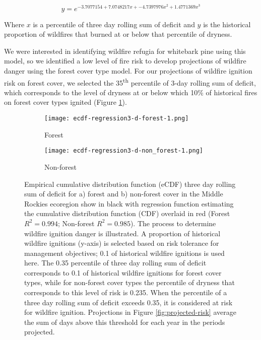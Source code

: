 \documentclass[11p]{article}
\begin{document}
\begin{equation*}
  y = e^{-3.7077154 + 7.0748217x + -4.7397976x^2 + 1.4771369x^3}
\end{equation*}

Where $x$ is a percentile of three day rolling sum of deficit and $y$ is the historical proportion of wildfires that burned at or below that percentile of dryness.

We were interested in identifying wildfire refugia for whitebark pine using this model, so we identified a low level of fire risk to develop projections of wildfire danger using the forest cover type model. For our projections of wildfire ignition risk on forest cover, we selected the 35\textsuperscript{th} percentile of 3-day rolling sum of deficit, which corresponds to the level of dryness at or below which 10\% of historical fires on forest cover types ignited (Figure \ref{fig:ecdf-forest}). 

\begin{figure}[!htbp]
  \centering
  \begin{subfigure}{.5\textwidth}
    \texttt{[image: ecdf-regression3-d-forest-1.png]}
    \caption{Forest}
    \label{fig:ecdf-forest}
  \end{subfigure}%
  \begin{subfigure}{.5\textwidth}
    \texttt{[image: ecdf-regression3-d-non\_forest-1.png]}
    \caption{Non-forest}
    \label{fig:ecdf-non-forest}
  \end{subfigure}
  \caption{Empirical cumulative distribution function (eCDF) three day rolling sum of deficit for a) forest and b) non-forest cover in the Middle Rockies ecoregion show in black with regression function estimating the cumulative distribution function (CDF) overlaid in red (Forest $R^2 = 0.994$; Non-forest $R^2=0.985$). The process to determine wildfire ignition danger is illustrated. A proportion of historical wildfire ignitions (y-axis) is selected based on risk tolerance for management objectives; 0.1 of historical wildfire ignitions is used here. The 0.35 percentile of three day rolling sum of deficit corresponds to 0.1 of historical wildfire ignitions for forest cover types, while for non-forest cover types the percentile of dryness that corresponds to this level of risk is 0.235. When the percentile of a three day rolling sum of deficit exceeds 0.35, it is considered at risk for wildfire ignition. Projections in Figure \ref{fig:projected-risk} average the sum of days above this threshold for each year in the periods projected.}
  \label{fig:ecdf}
\end{figure}
\end{document}
